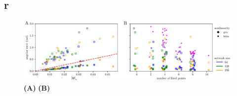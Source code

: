 \documentclass{article}
\begin{document}
\subsection*{r}
\begin{figure}[tbhp]
  \centering
  \includegraphics[width=\textwidth]{angular_losses_lstm_gru}
  \caption{
    \textbf{(A)}
    \textbf{(B)} 
}\label{fig:angular_losses_lstm_gru}
\end{figure}
\end{document}
